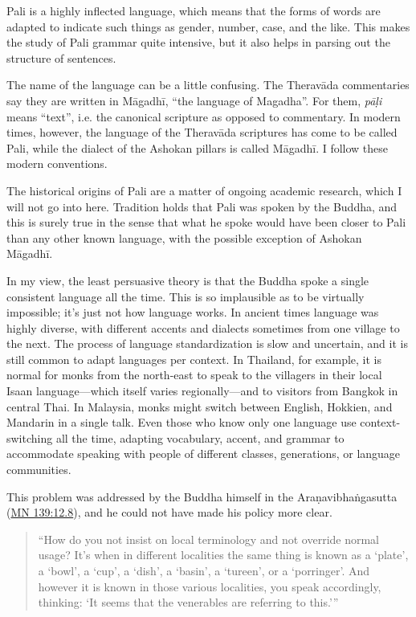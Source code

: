 \documentclass[12pt,openany]{book}%
\begin{document}
Pali is a highly inflected language, which means that the forms of words are adapted to indicate such things as gender, number, case, and the like. This makes the study of Pali grammar quite intensive, but it also helps in parsing out the structure of sentences.

The name of the language can be a little confusing. The \textsanskrit{Theravāda} commentaries say they are written in \textsanskrit{Māgadhī}, “the language of Magadha”. For them, \textit{\textsanskrit{pāḷi}} means “text”, i.e. the canonical scripture as opposed to commentary. In modern times, however, the language of the \textsanskrit{Theravāda} scriptures has come to be called Pali, while the dialect of the Ashokan pillars is called \textsanskrit{Māgadhī}. I follow these modern conventions.

The historical origins of Pali are a matter of ongoing academic research, which I will not go into here. Tradition holds that Pali was spoken by the Buddha, and this is surely true in the sense that what he spoke would have been closer to Pali than any other known language, with the possible exception of Ashokan \textsanskrit{Māgadhī}.

In my view, the least persuasive theory is that the Buddha spoke a single consistent language all the time. This is so implausible as to be virtually impossible; it’s just not how language works. In ancient times language was highly diverse, with different accents and dialects sometimes from one village to the next. The process of language standardization is slow and uncertain, and it is still common to adapt languages per context. In Thailand, for example, it is normal for monks from the north-east to speak to the villagers in their local Isaan language—which itself varies regionally—and to visitors from Bangkok in central Thai. In Malaysia, monks might switch between English, Hokkien, and Mandarin in a single talk. Even those who know only one language use context-switching all the time, adapting vocabulary, accent, and grammar to accommodate speaking with people of different classes, generations, or language communities.

This problem was addressed by the Buddha himself in the \textsanskrit{Araṇavibhaṅgasutta} (\href{https://suttacentral.net/mn139}{MN 139:12.8}), and he could not have made his policy more clear.

\begin{quotation}%
“How do you not insist on local terminology and not override normal usage?  It’s when in different localities the same thing is known as a ‘plate’, a ‘bowl’, a ‘cup’, a ‘dish’, a ‘basin’, a ‘tureen’, or a ‘porringer’.  And however it is known in those various localities, you speak accordingly, thinking: ‘It seems that the venerables are referring to this.’”

%
\end{quotation}
\end{document}
